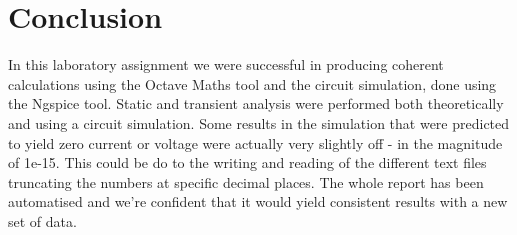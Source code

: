 \newpage
\section{Conclusion}
\label{sec:conclusion}
In this laboratory assignment we were successful in producing coherent calculations using the Octave Maths tool and the circuit simulation, done using the Ngspice tool. Static and transient analysis were performed both theoretically and using a circuit simulation. Some results in the simulation that were predicted to yield zero current or voltage were actually very slightly off - in the magnitude of 1e-15. This could be do to the writing and reading of the different text files truncating the numbers at specific decimal places. The whole report has been automatised and we're confident that it would yield consistent results with a new set of data.
